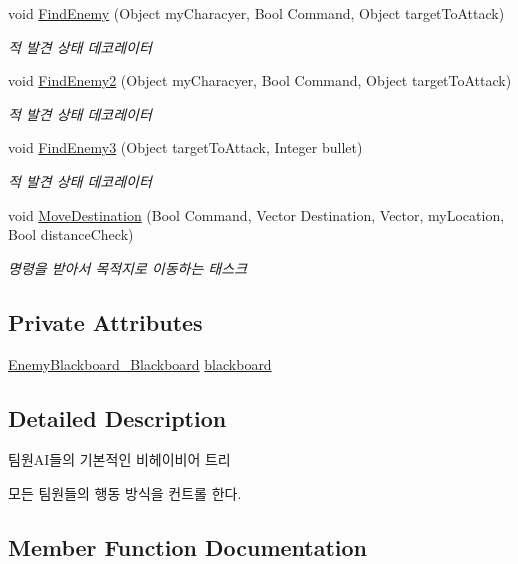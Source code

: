 \begin{DoxyCompactItemize}
void \hyperlink{class_b_t___base_aae303238f1a4876a0dc077a91c25b57f}{Find\+Enemy} (Object my\+Characyer, Bool Command, Object target\+To\+Attack)
\begin{DoxyCompactList}\small\item\em 적 발견 상태 데코레이터 \end{DoxyCompactList}\item 
void \hyperlink{class_b_t___base_a69b8c8c1711027633033b4c7e04e973b}{Find\+Enemy2} (Object my\+Characyer, Bool Command, Object target\+To\+Attack)
\begin{DoxyCompactList}\small\item\em 적 발견 상태 데코레이터 \end{DoxyCompactList}\item 
void \hyperlink{class_b_t___base_a2467b31b837f61678c1c6a9527289205}{Find\+Enemy3} (Object target\+To\+Attack, Integer bullet)
\begin{DoxyCompactList}\small\item\em 적 발견 상태 데코레이터 \end{DoxyCompactList}\item 
void \hyperlink{class_b_t___base_a589c2fe0cc37e24c84ea3ed57157dc60}{Move\+Destination} (Bool Command, Vector Destination, Vector, my\+Location, Bool distance\+Check)
\begin{DoxyCompactList}\small\item\em 명령을 받아서 목적지로 이동하는 태스크 \end{DoxyCompactList}\end{DoxyCompactItemize}
\subsection*{Private Attributes}
\begin{DoxyCompactItemize}
\item 
\hyperlink{class_enemy_blackboard___blackboard}{Enemy\+Blackboard\+\_\+\+Blackboard} \hyperlink{class_b_t___base_a8a095b67df2778f5155d24dad9f818ef}{blackboard}
\end{DoxyCompactItemize}


\subsection{Detailed Description}
팀원\+A\+I들의 기본적인 비헤이비어 트리 

모든 팀원들의 행동 방식을 컨트롤 한다. 

\subsection{Member Function Documentation}
